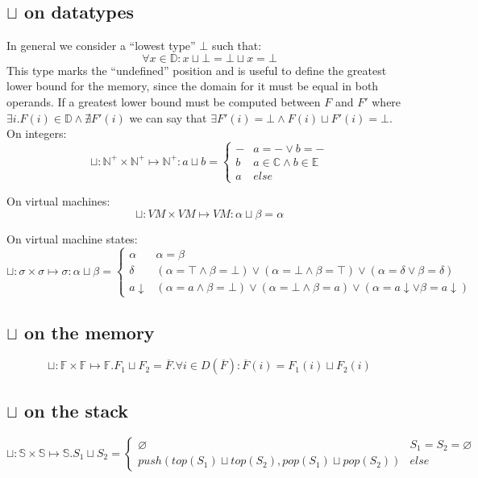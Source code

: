 \documentclass{amsart}
\newcommand{\N}{\mathbb{N}}
\newcommand{\E}{\mathbb{E}}
\newcommand{\C}{\mathbb{C}}
\newcommand{\bF}{\mathbb{F}}
\newcommand{\bS}{\mathbb{S}}
\newcommand{\data}{\mathbb{D}}
\newcommand{\down}[1]{#1\downarrow}
\newcommand{\Int}{\N^+}
\renewcommand{\emptyset}{\varnothing}
\numberwithin{equation}{section}
\theoremstyle{plain} %
\theoremstyle{definition}
\theoremstyle{remark}
\begin{document}
\subsection{$\sqcup$ on datatypes}
In general we consider a ``lowest type'' $\bot$ such that:
\[ \forall x \in \data{}: x \sqcup \bot = \bot \sqcup x = \bot \]
This type marks the ``undefined'' position and is useful to define the greatest lower bound for the memory, since the domain for it must be equal in both operands. If a greatest lower bound must be computed between $F$ and $F'$ where $\exists i. F(i) \in \data{} \wedge \nexists F'(i)$ we can say that $\exists F'(i) = \bot \wedge F(i) \sqcup F'(i) = \bot$.\\


On integers:
\[ \sqcup: \Int{} \times \Int{} \mapsto \Int{}: a \sqcup b =
\begin{cases}
- & a = - \vee b = -\\
b & a \in \C{} \wedge b \in \E{} \\
a & else
\end{cases} \]

On virtual machines:
\[ \sqcup: VM \times VM \mapsto VM: \alpha \sqcup \beta = \alpha\]

On virtual machine states:
\[ \sqcup: \sigma \times \sigma \mapsto \sigma: \alpha \sqcup \beta =
\begin{cases}
\alpha & \alpha = \beta\\
\delta & (\alpha = \top \wedge \beta = \bot) \vee (\alpha = \bot \wedge \beta = \top) \vee (\alpha = \delta \vee \beta = \delta)\\
\down{a} & (\alpha = a \wedge \beta = \bot) \vee (\alpha = \bot \wedge \beta = a) \vee (\alpha = \down{a} \vee \beta = \down{a})
\end{cases} \]

\subsection{$\sqcup$ on the memory}
\[\sqcup: \bF{} \times \bF{} \mapsto \bF{}. F_1 \sqcup F_2 = \overline{F}.\forall i \in D(\overline{F}): \overline{F}(i) = F_1(i) \sqcup F_2(i)\]

\subsection{$\sqcup$ on the stack}
\[
\sqcup: \bS{} \times \bS{} \mapsto \bS{}. S_1 \sqcup S_2 =
\begin{cases}
\emptyset & S_1 = S_2 = \emptyset\\
push(top(S_1) \sqcup top(S_2), pop(S_1) \sqcup pop(S_2)) & else
\end{cases}
\]
\end{document}
